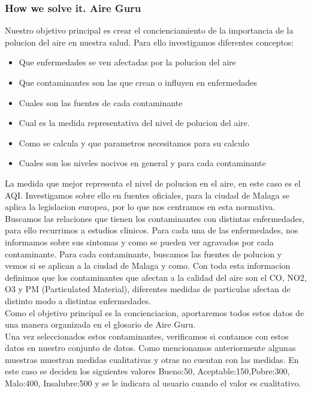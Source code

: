 \subsubsection{How we solve it. Aire Guru} 
Nuestro objetivo principal es crear el concienciamiento de la importancia de la polucion del aire en nuestra salud. Para ello investigamos diferentes conceptos:
\begin{itemize}
    \item Que enfermedades se ven afectadas por la polucion del aire
    \item Que contaminantes son las que crean o influyen en enfermedades
    \item Cuales son las fuentes de cada contaminante
    \item Cual es la medida representativa del nivel de polucion del aire.
    \item Como se calcula y que parametros necesitamos para su calculo
    \item Cuales son los niveles nocivos en general y para cada contaminante
\end{itemize}
La medida que mejor representa el nivel de polucion en el aire, en este caso es el AQI. Investigamos sobre ello en fuentes oficiales, para la ciudad de Malaga se aplica la 
legislacion europea, por lo que nos centramos en esta normativa.
Buscamos las relaciones que tienen los contaminantes con distintas enfermedades, para ello recurrimos a estudios clinicos. Para cada una de las enfermedades, nos informamos
sobre sus sintomas y como se pueden ver agravados por cada contaminante.
Para cada contaminante, buscamos las fuentes de polucion y vemos si se aplican a la ciudad de Malaga y como.
Con toda esta informacion definimos que los contaminantes que afectan a la calidad del aire son el CO, NO2, O3 y PM (Particulated Material), diferentes medidas de particulas
afectan de distinto modo a distintas enfermedades.\\

Como el objetivo principal es la concienciacion, aportaremos todos estos datos de una manera organizada en el glosario de Aire Guru.\\

Una vez seleccionados estos contaminantes, verificamos si contamos con estos datos en nuestro conjunto de datos. Como mencionamos anteriormente algunas muestras
muestran medidas cualitativas y otras no cuentan con las medidas. En este caso se deciden los siguientes valores Bueno:50, Aceptable:150,Pobre:300, Malo:400, Insalubre:500
y se le indicara al usuario cuando el valor es cualitativo.\\


